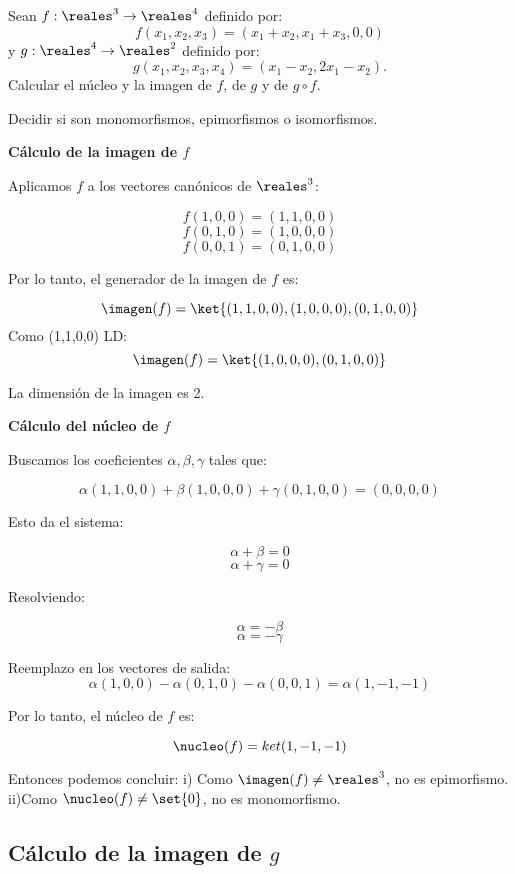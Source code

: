 \begin{enunciado}{\ejercicio}
  Sean $ f: \reales^3 \to \reales^4 $ definido por:
  $$
    f(x_1, x_2, x_3) = (x_1 + x_2, x_1 + x_3, 0, 0)
  $$
  y $ g: \reales^4 \to \reales^2 $ definido por:
  $$
    g(x_1, x_2, x_3, x_4) = (x_1 - x_2, 2x_1 - x_2).
  $$
  Calcular el núcleo y la imagen de $f$, de $g$ y de $g \circ f$.

  Decidir si son monomorfismos, epimorfismos o isomorfismos.
\end{enunciado}

\medskip

\textbf{Cálculo de la imagen de $f$}

Aplicamos $f$ a los vectores canónicos de $\reales^3$:

$$ f(1,0,0) = (1,1,0,0) $$
$$ f(0,1,0) = (1,0,0,0) $$
$$ f(0,0,1) = (0,1,0,0) $$

Por lo tanto, el generador de la imagen de $ f $ es:

$$ \imagen(f) = \ket{(1,1,0,0), (1,0,0,0), (0,1,0,0)} $$
Como (1,1,0,0) LD:
$$ \imagen(f) = \ket{(1,0,0,0), (0,1,0,0)} $$

La dimensión de la imagen es 2.

\medskip

\textbf{Cálculo del núcleo de $ f $}

Buscamos los coeficientes $ \alpha, \beta, \gamma $ tales que:

$$ \alpha(1,1,0,0) + \beta(1,0,0,0) + \gamma(0,1,0,0) = (0,0,0,0) $$

Esto da el sistema:

$$ \alpha + \beta = 0 $$
$$ \alpha + \gamma = 0 $$

Resolviendo:

$$ \alpha = -\beta $$
$$ \alpha = -\gamma $$

Reemplazo en los vectores de salida:
$$ \alpha(1,0,0) - \alpha(0,1,0) - \alpha(0,0,1) = \alpha(1,-1,-1) $$

Por lo tanto, el núcleo de $ f $ es:

$$ \nucleo(f) = ket{(1,-1,-1)} $$

Entonces podemos concluir:
\newline
i) Como $ \imagen(f) \neq \reales^3 $, no es epimorfismo.
\newline
ii)Como $ \nucleo(f) \neq \set{0} $, no es monomorfismo.

\subsection*{Cálculo de la imagen de $ g $}

